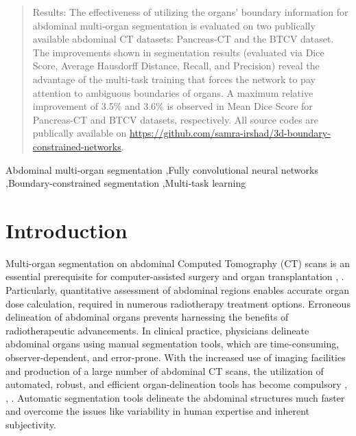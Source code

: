 \documentclass[final,5p,times,twocolumn]{elsarticle}
\begin{document}
\begin{frontmatter}
\begin{abstract}
Results: The effectiveness of utilizing the organs' boundary information for abdominal multi-organ segmentation is evaluated on two publically available abdominal CT datasets: Pancreas-CT and the BTCV dataset. The improvements shown in segmentation results (evaluated via Dice Score, Average Hausdorff Distance, Recall, and Precision) reveal the advantage of the multi-task training that forces the network to pay attention to ambiguous boundaries of organs. A maximum relative improvement of 3.5\% and 3.6\% is observed in Mean Dice Score for Pancreas-CT and BTCV datasets, respectively. All source codes are publically available on \url{https://github.com/samra-irshad/3d-boundary-constrained-networks}.
\end{abstract}

\begin{keyword}




Abdominal multi-organ segmentation \sep Fully convolutional neural networks \sep Boundary-constrained segmentation \sep Multi-task learning
\end{keyword}

\end{frontmatter}



\section{Introduction}
\label{sec:intro}
Multi-organ segmentation on abdominal Computed Tomography (CT) scans is an essential prerequisite for computer-assisted surgery and organ transplantation \cite{okada2012multi}, \cite{gibson2018automatic}. Particularly, quantitative assessment of abdominal regions enables accurate organ dose calculation, required in numerous radiotherapy treatment options. Erroneous delineation of abdominal organs prevents harnessing the benefits of radiotherapeutic advancements. In clinical practice, physicians delineate abdominal organs using manual segmentation tools, which are time-consuming, observer-dependent, and error-prone. With the increased use of imaging facilities and production of a large number of abdominal CT scans, the utilization of automated, robust, and efficient organ-delineation tools has become compulsory \cite{gibson2018automatic}, \cite{hu2017automatic}, \cite{article1kim}. Automatic segmentation tools delineate the abdominal structures much faster and overcome the issues like variability in human expertise and inherent subjectivity.
\end{document}
